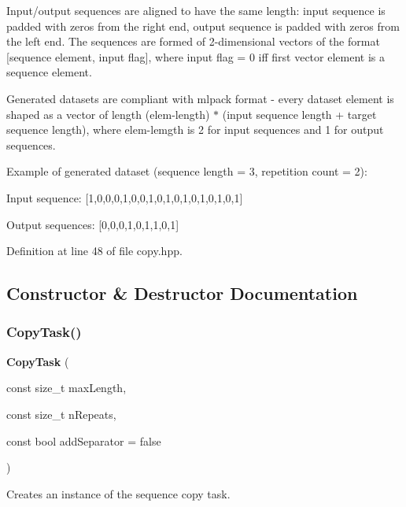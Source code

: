 Input/output sequences are aligned to have the same length\+: input sequence is padded with zeros from the right end, output sequence is padded with zeros from the left end. The sequences are formed of 2-\/dimensional vectors of the format [sequence element, input flag], where input flag = 0 iff first vector element is a sequence element.

Generated datasets are compliant with mlpack format -\/ every dataset element is shaped as a vector of length (elem-\/length) $\ast$ (input sequence length + target sequence length), where elem-\/lemgth is 2 for input sequences and 1 for output sequences.

Example of generated dataset (sequence length = 3, repetition count = 2)\+:
\begin{DoxyItemize}
\item Input sequence\+: [1,0,0,0,1,0,0,1,0,1,0,1,0,1,0,1,0,1]
\item Output sequences\+: [0,0,0,1,0,1,1,0,1] 
\end{DoxyItemize}

Definition at line 48 of file copy.\+hpp.



\subsection{Constructor \& Destructor Documentation}
\mbox{\label{classmlpack_1_1ann_1_1augmented_1_1tasks_1_1CopyTask_a0fc32ddc494bc9c5e215226fc3da44dd}} 
\subsubsection{Copy\+Task()}
{\footnotesize\ttfamily \textbf{ Copy\+Task} (\begin{DoxyParamCaption}\item[{const size\+\_\+t}]{max\+Length,  }\item[{const size\+\_\+t}]{n\+Repeats,  }\item[{const bool}]{add\+Separator = {\ttfamily false} }\end{DoxyParamCaption})}



Creates an instance of the sequence copy task. 


